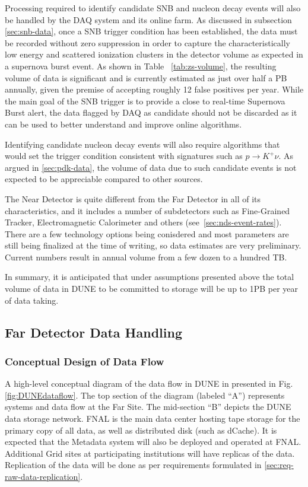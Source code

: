Processing required to identify candidate SNB and nucleon decay events will also be handled by the DAQ system and its online farm.
As discussed in subsection \ref{sec:snb-data}, once a SNB trigger condition has been established, the data must
be recorded without zero suppression in order to capture the characteristically low energy and scattered ionization
clusters in the detector volume as expected in a supernova burst event. As shown in Table~ \ref{tab:zs-volume}, the resulting
volume of data is significant and is currently estimated as just over half a PB annually, given the premise of accepting roughly
12 false positives per year. While the main goal of the SNB trigger is to provide a close to real-time Supernova Burst alert, the data
flagged by DAQ as candidate should not be discarded as it can be used to better understand and improve online algorithms.

Identifying candidate nucleon decay events will also require algorithms that would set the trigger condition consistent
with signatures such as $p \rightarrow K^+\nu$. As argued in \ref{sec:pdk-data}, the volume of data due to such candidate
events is not expected to be appreciable compared to other sources.

The Near Detector is quite different from the Far Detector in all of its characteristics, and it includes a number of subdetectors
such as Fine-Grained Tracker, Electromagnetic Calorimeter and others (see~\ref{sec:nds-event-rates}). There are a few technology
options being conisdered and most parameters are still being finalized at the time of writing, so data estimates are very preliminary.
Current numbers result in annual volume from a few dozen to a hundred TB.

In summary, it is anticipated that under assumptions presented above the total volume of data in DUNE to be
committed to storage will be up to 1PB per year of data taking.

\subsection{Far Detector Data Handling}
\subsubsection{Conceptual Design of Data Flow}
A high-level conceptual diagram of the data flow in DUNE in presented in Fig.\ref{fig:DUNEdataflow}.
The top section of the diagram (labeled ``A'') represents systems and data flow at the Far Site.
The mid-section ``B'' depicts the DUNE data storage network. FNAL is the main data center
hosting tape storage for the primary copy of all data, as well as distributed disk (such as dCache).
It is expected that the Metadata system will also be deployed and operated at FNAL.
Additional Grid sites at participating institutions will have replicas of the data.
Replication of the data will be done as per requirements formulated in \ref{sec:req-raw-data-replication}.

